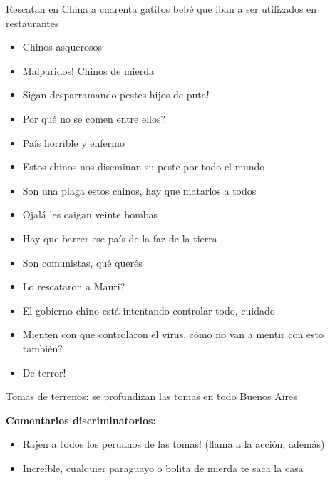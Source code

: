 \begin{displayquote}
     Rescatan en China a cuarenta gatitos bebé que iban a ser utilizados en restaurantes

    \begin{itemize}
        \item Chinos asquerosos
        \item Malparidos! Chinos de mierda
        \item Sigan desparramando pestes hijos de puta!
        \item Por qué no se comen entre ellos?
        \item País horrible y enfermo
        \item Estos chinos nos diseminan su peste por todo el mundo
    \end{itemize}


    \begin{itemize}
        \item Son una plaga estos chinos, hay que matarlos a todos
        \item Ojalá les caigan veinte bombas
        \item Hay que barrer ese país de la faz de la tierra
    \end{itemize}


    \begin{itemize}
        \item Son comunistas, qué querés
        \item Lo rescataron a Mauri?
        \item El gobierno chino está intentando controlar todo, cuidado
        \item Mienten con que controlaron el virus, cómo no van a mentir con esto también?
        \item De terror!
    \end{itemize}

     Tomas de terrenos: se profundizan las tomas en todo Buenos Aires


    \bf{Comentarios discriminatorios:}

    \begin{itemize}
        \item Rajen a todos los peruanos de las tomas! (llama a la acción, además)
        \item Increíble, cualquier paraguayo o bolita de mierda te saca la casa
    \end{itemize}

\end{displayquote}






